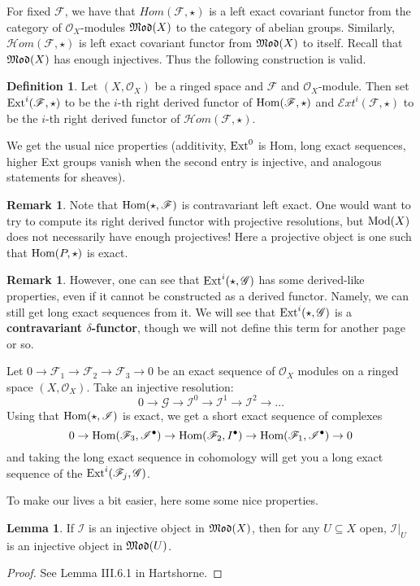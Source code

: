 \documentclass[10pt,reqno]{amsart}
\theoremstyle{definition}
\newtheorem{definition}[theorem]{Definition}
\newtheorem{lemma}[theorem]{Lemma}
\newtheorem{remark}[theorem]{Remark}
\theoremstyle{remark}
\numberwithin{equation}{section}
\numberwithin{theorem}{section}
\newcommand{\OO}{{\mathcal O}}
\newcommand{\Hom}{\textup{Hom}}
\newcommand{\Ext}{\textup{Ext}}
\newcommand{\scrHom}{\mathscr{H}om}
\newcommand{\scrExt}{\mathscr{E}xt}
\newcommand{\FF}{{\mathscr F}}
\newcommand{\II}{{\mathscr I}}
\newcommand{\GG}{{\mathscr G}}
\begin{document}
For fixed $\FF$, we have that $Hom(\FF,\star)$ is a left exact covariant functor from the category of $\OO_X$-modules $\frak{Mod}(X)$ to the category of abelian groups. Similarly, $\scrHom(\FF,\star)$ is left exact covariant functor from $\frak{Mod}(X)$ to itself. Recall that $\frak{Mod}(X)$ has enough injectives. Thus the following construction is valid.

\begin{definition} Let $(X,\OO_X)$ be a ringed space and $\FF$ and $\OO_X$-module. Then set $\Ext^i(\FF,\star)$ to be the $i$-th right derived functor of $\Hom(\FF,\star)$ and $\scrExt^i(\FF,\star)$ to be the $i$-th right derived functor of $\scrHom(\FF,\star)$.
\end{definition}

We get the usual nice properties (additivity, $\Ext^0$ is Hom, long exact sequences, higher Ext groups vanish when the second entry is injective, and analogous statements for sheaves). 

\begin{remark} Note that $\Hom(\star,\FF)$ is contravariant left exact. One would want to try to compute its right derived functor with projective resolutions, but $\textup{Mod}(X)$ does not necessarily have enough projectives! Here a projective object is one such that $\Hom(P,\star)$ is exact. 
\end{remark}

\begin{remark} However, one can see that $\Ext^i(\star,\GG)$ has some derived-like properties, even if it cannot be constructed as a derived functor. Namely, we can still get long exact sequences from it. We will see that $\Ext^i(\star,\GG)$ is a \textbf{contravariant $\delta$-functor}, though we will not define this term for another page or so.

Let $0 \to \FF_1 \to \FF_2 \to \FF_3 \to 0$ be an exact sequence of $\OO_X$ modules on a ringed space $(X,\OO_X)$. Take an injective resolution:
\[0 \to \GG \to \II^0 \to \II^1 \to \II^2 \to \dots\]
Using that $\Hom(\star,\II)$ is exact, we get a short exact sequence of complexes
\[0 \to \Hom(\FF_3, \II^{\bullet}) \to \Hom(\FF_2,I^{\bullet}) \to \Hom(\FF_1,\II^{\bullet}) \to 0\]
and taking the long exact sequence in cohomology will get you a long exact sequence of the $\Ext^i(\FF_j, \GG)$.
\end{remark}

To make our lives a bit easier, here some some nice properties.

\begin{lemma} If $\II$ is an injective object in $\frak{Mod}(X)$, then for any $U \subseteq X$ open, $\II|_U$ is an injective object in $\frak{Mod}(U)$. 
\end{lemma}
\begin{proof}
See Lemma III.6.1 in Hartshorne.
\end{proof}
\end{document}
